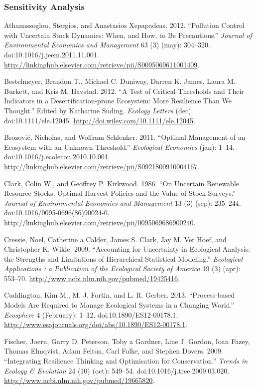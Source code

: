 \documentclass[author-year, review]{elsarticle} %
\begin{document}
\subsubsection{Sensitivity Analysis}\label{sensitivity-analysis}

Athanassoglou, Stergios, and Anastasios Xepapadeas. 2012. ``Pollution
Control with Uncertain Stock Dynamics: When, and How, to Be
Precautious.'' \emph{Journal of Environmental Economics and Management}
63 (3) (may): 304--320. doi:10.1016/j.jeem.2011.11.001.
\url{http://linkinghub.elsevier.com/retrieve/pii/S0095069611001409}.

Bestelmeyer, Brandon T., Michael C. Duniway, Darren K. James, Laura M.
Burkett, and Kris M. Havstad. 2012. ``A Test of Critical Thresholds and
Their Indicators in a Desertification-prone Ecosystem: More Resilience
Than We Thought.'' Edited by Katharine Suding. \emph{Ecology Letters}
(dec). doi:10.1111/ele.12045.
\url{http://doi.wiley.com/10.1111/ele.12045}.

Brozović, Nicholas, and Wolfram Schlenker. 2011. ``Optimal Management of
an Ecosystem with an Unknown Threshold.'' \emph{Ecological Economics}
(jan): 1--14. doi:10.1016/j.ecolecon.2010.10.001.
\url{http://linkinghub.elsevier.com/retrieve/pii/S0921800910004167}.

Clark, Colin W., and Geoffrey P. Kirkwood. 1986. ``On Uncertain
Renewable Resource Stocks: Optimal Harvest Policies and the Value of
Stock Surveys.'' \emph{Journal of Environmental Economics and
Management} 13 (3) (sep): 235--244. doi:10.1016/0095-0696(86)90024-0.
\url{http://linkinghub.elsevier.com/retrieve/pii/0095069686900240}.

Cressie, Noel, Catherine a Calder, James S. Clark, Jay M. Ver Hoef, and
Christopher K. Wikle. 2009. ``Accounting for Uncertainty in Ecological
Analysis: the Strengths and Limitations of Hierarchical Statistical
Modeling.'' \emph{Ecological Applications : a Publication of the
Ecological Society of America} 19 (3) (apr): 553--70.
\url{http://www.ncbi.nlm.nih.gov/pubmed/19425416}.

Cuddington, Kim M., M. J. Fortin, and L. R. Gerber. 2013.
``Process-based Models Are Required to Manage Ecological Systems in a
Changing World.'' \emph{Ecosphere} 4 (February): 1--12.
doi:10.1890/ES12-00178.1.
\url{http://www.esajournals.org/doi/abs/10.1890/ES12-00178.1}.

Fischer, Joern, Garry D. Peterson, Toby a Gardner, Line J. Gordon, Ioan
Fazey, Thomas Elmqvist, Adam Felton, Carl Folke, and Stephen Dovers.
2009. ``Integrating Resilience Thinking and Optimisation for
Conservation.'' \emph{Trends in Ecology \& Evolution} 24 (10) (oct):
549--54. doi:10.1016/j.tree.2009.03.020.
\url{http://www.ncbi.nlm.nih.gov/pubmed/19665820}.
\end{document}
